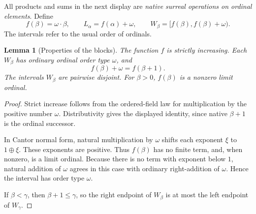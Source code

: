 \documentclass[11pt,letterpaper]{article}
\newtheorem{lemma}[lemma]{Lemma}\aliascntresetthe{lemma}
\theoremstyle{definition}
\theoremstyle{remark}
\newcommand{\nsum}{\mathbin{\oplus}}
\begin{document}
All products and sums in the next display are \emph{native surreal operations on
ordinal elements}. Define
\[
 f(\beta)=\omega\cdot\beta,\qquad L_\alpha=f(\alpha)+\omega,\qquad
 W_\beta=[f(\beta),f(\beta)+\omega).
\]
The intervals refer to the usual order of ordinals.

\begin{lemma}[Properties of the blocks]\label{hset:sf:lem:blocks}
The function $f$ is strictly increasing. Each $W_\beta$ has ordinary ordinal order
type $\omega$, and
\[
 f(\beta)+\omega=f(\beta+1).
\]
The intervals $W_\beta$ are pairwise disjoint. For $\beta>0$, $f(\beta)$ is a
nonzero limit ordinal.
\end{lemma}
\begin{proof}
Strict increase follows from the ordered-field law for multiplication by the
positive number $\omega$. Distributivity gives the displayed identity, since
native $\beta+1$ is the ordinal successor.

In Cantor normal form, natural multiplication by $\omega$ shifts each exponent
$\xi$ to $1\nsum\xi$. These exponents are positive. Thus $f(\beta)$ has no finite
term, and, when nonzero, is a limit ordinal. Because there is no term with
exponent below $1$, natural addition of $\omega$ agrees in this case with ordinary
right-addition of $\omega$. Hence the interval has order type $\omega$.

If $\beta<\gamma$, then $\beta+1\le\gamma$, so the right endpoint of $W_\beta$ is
at most the left endpoint of $W_\gamma$.
\end{proof}
\end{document}
